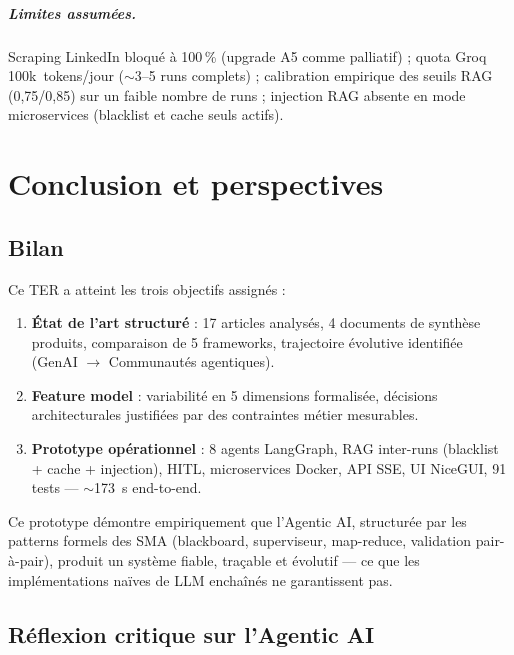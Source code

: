\documentclass[12pt,a4paper]{report}
\begin{document}
\paragraph{Limites assumées.}
Scraping LinkedIn bloqué à 100\,\% (upgrade A5 comme palliatif) ; quota Groq
100k~tokens/jour ($\sim$3--5 runs complets) ; calibration empirique des seuils
RAG (0,75/0,85) sur un faible nombre de runs ; injection RAG absente en mode
microservices (blacklist et cache seuls actifs).

\chapter{Conclusion et perspectives}
\label{chap:conclusion}

\section{Bilan}

Ce TER a atteint les trois objectifs assignés :

\begin{enumerate}
  \item \textbf{État de l'art structuré} : 17 articles analysés, 4 documents de
        synthèse produits, comparaison de 5 frameworks, trajectoire évolutive
        identifiée (GenAI $\to$ Communautés agentiques).
  \item \textbf{Feature model} : variabilité en 5 dimensions formalisée, décisions
        architecturales justifiées par des contraintes métier mesurables.
  \item \textbf{Prototype opérationnel} : 8 agents LangGraph, RAG inter-runs
        (blacklist + cache + injection), HITL, microservices Docker, API SSE,
        UI NiceGUI, 91 tests --- $\sim$173~s end-to-end.
\end{enumerate}

Ce prototype démontre empiriquement que l'Agentic AI, structurée par les patterns
formels des SMA (blackboard, superviseur, map-reduce, validation pair-à-pair),
produit un système fiable, traçable et évolutif --- ce que les implémentations naïves
de LLM enchaînés ne garantissent pas.

\section{Réflexion critique sur l'Agentic AI}
\end{document}
